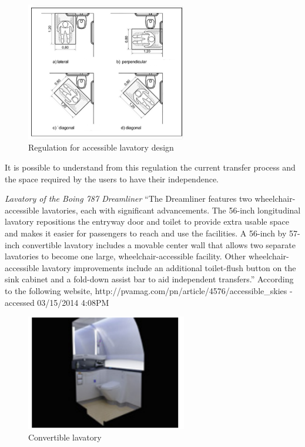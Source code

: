 \begin{figure}[h]
\centering
\includegraphics[width=7cm]{brazil_images/image014.png}
\caption{Regulation for accessible lavatory design}
\label{fig:regulation_accessible_lavatory}
\end{figure}


It is possible to understand from this regulation the current transfer process and the space required by the users to have their independence.

\emph{Lavatory of the Boing 787 Dreamliner} “The Dreamliner features two wheelchair-accessible lavatories, each with significant advancements. The 56-inch longitudinal lavatory repositions the entryway door and toilet to provide extra usable space and makes it easier for passengers to reach and use the facilities. A 56-inch by 57-inch convertible lavatory includes a movable center wall that allows two separate lavatories to become one large, wheelchair-accessible facility. Other wheelchair-accessible lavatory improvements include an additional toilet-flush button on the sink cabinet and a fold-down assist bar to aid independent transfers.”  According to the following website, http://pvamag.com/pn/article/4576/accessible\_skies - accessed 03/15/2014 4:08PM

\begin{figure}[h]
\centering
\includegraphics[width=7cm]{brazil_images/image015.png}
\caption{Convertible lavatory}
\label{fig:convertible_lavatory}
\end{figure}


